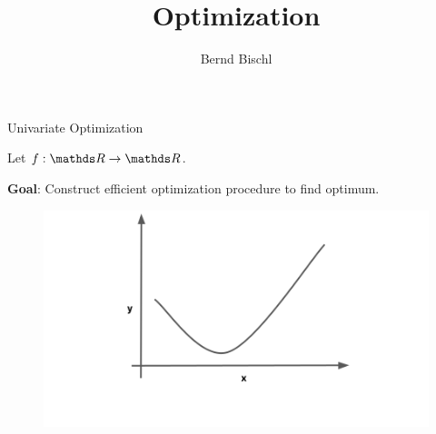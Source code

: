 




\newcommand{\titlefigure}{figure_man/golden-ratio-6.png}
\newcommand{\learninggoals}{
\item TODO
}



\title{Optimization}
\author{Bernd Bischl}
\date{}



\sloppy

\begin{vbframe}{Univariate Optimization}

Let $f: \R \to \R$. 

\lz 

\textbf{Goal}: Construct efficient optimization procedure to find optimum. 

\vspace*{0.2cm} 

\begin{figure}
  \includegraphics{figure_man/golden-ratio-0.png}
\end{figure}

\end{vbframe}

